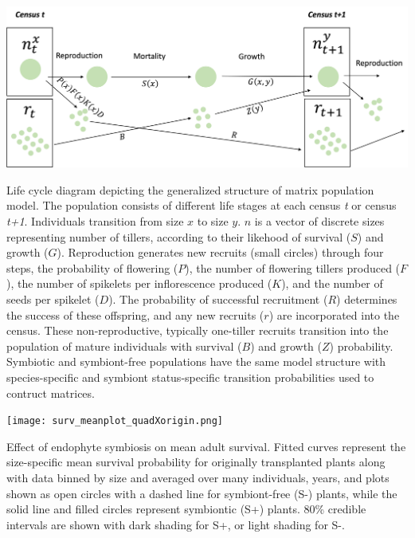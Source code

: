 \documentclass[lineno, sn-basic]{sn-jnl}%
\begin{document}
\renewcommand\themyfigure{S\arabic{myfigure}}   
\setcounter{figure}{0}    

\begin{myfigure}[H]
	\centering
	\includegraphics[width=\linewidth]{life_cycle_diagram.png}
	\caption[Life cycle diagram depicting the generalized structure of matrix population model]{Life cycle diagram depicting the generalized structure of matrix population model. 
		The population consists of different life stages at each census \emph{t} or census \emph{t+1}. Individuals transition from size $x$ to size $y$. $n$ is a vector of discrete sizes representing number of tillers, according to their likehood of survival ($S$) and growth ($G$).  Reproduction generates new recruits (small circles) through four steps, the probability of flowering ($P$), the number of flowering tillers produced ($F$), the number of spikelets per inflorescence produced ($K$), and the number of seeds per spikelet ($D$). The probability of successful recruitment ($R$) determines the success of these offspring, and any new recruits ($r$) are incorporated into the census. These non-reproductive, typically one-tiller recruits transition into the population of mature individuals with survival ($B$) and growth ($Z$) probability. Symbiotic and symbiont-free populations have the same model structure with species-specific and symbiont status-specific transition probabilities used to contruct matrices.}
\end{myfigure}



\begin{myfigure}[H]
	\centering
	\texttt{[image: surv\_meanplot\_quadXorigin.png]}
	\caption[Effect of endophyte symbiosis on mean adult survival - Original]{Effect of endophyte symbiosis on mean adult survival. Fitted curves represent the size-specific mean survival probability for originally transplanted plants along with data binned by size and averaged over many individuals, years, and plots shown as open circles with a dashed line for symbiont-free (S-) plants, while the solid line and filled circles represent symbiontic (S+) plants. 80\% credible intervals are shown with dark shading for  S+, or light shading for S-.}
\end{myfigure}
\end{document}

